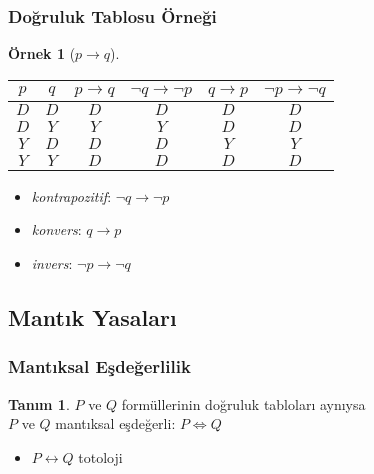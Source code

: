 \documentclass[dvipsnames]{beamer}
\theoremstyle{definition}
\newtheorem{tanim}[theorem]{Tanım}
\theoremstyle{example}
\newtheorem{ornek}[theorem]{Örnek}
\theoremstyle{plain}
\begin{document}
\begin{frame}
  \frametitle{Doğruluk Tablosu Örneği}

  \begin{ornek}[$p \rightarrow q$]
    \begin{center}
      \begin{tabular}{|c|c||c|c|c|c|}\hline
        $p$ & $q$ & $p \rightarrow q$ & $\neg q \rightarrow \neg p$ &
                    $q \rightarrow p$ & $\neg p \rightarrow \neg q$\\\hline\hline
        $D$ & $D$ & $D$ & $D$ & $D$ & $D$\\\hline
        $D$ & $Y$ & $Y$ & $Y$ & $D$ & $D$\\\hline
        $Y$ & $D$ & $D$ & $D$ & $Y$ & $Y$\\\hline
        $Y$ & $Y$ & $D$ & $D$ & $D$ & $D$\\\hline
      \end{tabular}
    \end{center}

    \pause
    \begin{itemize}
      \item \emph{kontrapozitif}: $\neg q \rightarrow \neg p$

      \pause
      \item \emph{konvers}: $q \rightarrow p$

      \pause
      \item \emph{invers}: $\neg p \rightarrow \neg q$
    \end{itemize}
  \end{ornek}
\end{frame}

\subsection{Mantık Yasaları}

\begin{frame}
  \frametitle{Mantıksal Eşdeğerlilik}

  \begin{tanim}
    $P$ ve $Q$ formüllerinin doğruluk tabloları aynıysa\\
      $P$ ve $Q$ \alert{mantıksal eşdeğerli}: $P \Leftrightarrow Q$
  \end{tanim}

  \begin{itemize}
    \item $P \leftrightarrow Q$ totoloji
  \end{itemize}
\end{frame}
\end{document}

